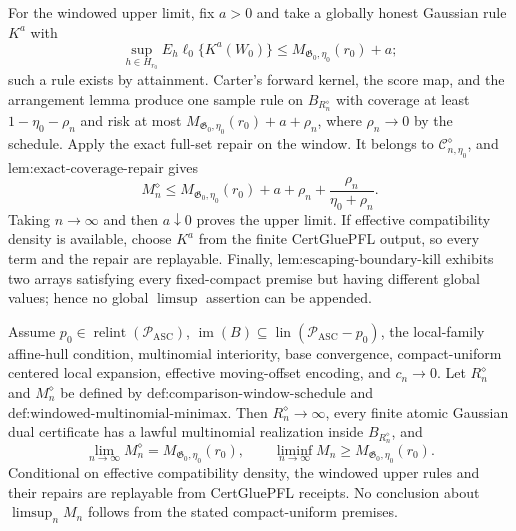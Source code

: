 For the windowed upper limit, fix \(a>0\) and take a globally honest Gaussian rule \(K^a\) with
\[
 \sup_{h\in H_{r_0}}E_h\ell_0\{K^a(W_0)\}
 \le M_{\mathfrak G_0,\eta_0}(r_0)+a;
\]
such a rule exists by attainment. Carter's forward kernel, the score map, and the arrangement lemma produce one sample rule on \(B_{R_n^{\diamond}}\) with coverage at least \(1-\eta_0-\rho_n\) and risk at most \(M_{\mathfrak G_0,\eta_0}(r_0)+a+\rho_n\), where \(\rho_n\to0\) by the schedule. Apply the exact full-set repair on the window. It belongs to \(\mathcal C_{n,\eta_0}^{\diamond}\), and \(\text{lem:exact-coverage-repair}\) gives
\[
 M_n^{\diamond}
 \le M_{\mathfrak G_0,\eta_0}(r_0)+a+\rho_n
 +\frac{\rho_n}{\eta_0+\rho_n}.
\]
Taking \(n\to\infty\) and then \(a\downarrow0\) proves the upper limit. If effective compatibility density is available, choose \(K^a\) from the finite CertGluePFL output, so every term and the repair are replayable. Finally, \(\text{lem:escaping-boundary-kill}\) exhibits two arrays satisfying every fixed-compact premise but having different global values; hence no global \(\limsup\) assertion can be appended.

Assume \(p_0\in\operatorname{relint}(\mathcal P_{\mathrm{ASC}})\), \(\operatorname{im}(B)\subseteq\operatorname{lin}(\mathcal P_{\mathrm{ASC}}-p_0)\), the local-family affine-hull condition, multinomial interiority, base convergence, compact-uniform centered local expansion, effective moving-offset encoding, and \(c_n\to0\). Let \(R_n^{\diamond}\) and \(M_n^{\diamond}\) be defined by \(\text{def:comparison-window-schedule}\) and \(\text{def:windowed-multinomial-minimax}\). Then \(R_n^{\diamond}\to\infty\), every finite atomic Gaussian dual certificate has a lawful multinomial realization inside \(B_{R_n^{\diamond}}\), and
\[
 \lim_{n\to\infty}M_n^{\diamond}
 =M_{\mathfrak G_0,\eta_0}(r_0),
 \qquad
 \liminf_{n\to\infty}M_n
 \ge M_{\mathfrak G_0,\eta_0}(r_0).
\]
Conditional on effective compatibility density, the windowed upper rules and their repairs are replayable from CertGluePFL receipts. No conclusion about \(\limsup_nM_n\) follows from the stated compact-uniform premises.

